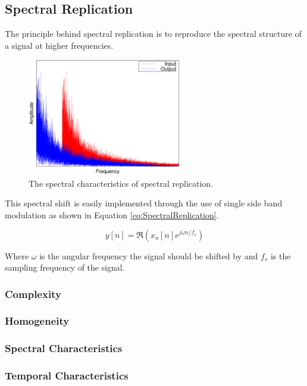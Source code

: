 	\subsection{Spectral Replication}
	\label{sec:Excitation-SpectralReplication}
		The principle behind spectral replication is to reproduce the spectral structure of a signal at higher
		frequencies.

		\begin{figure}[h!]
			\centering
			\includegraphics[width=0.6\textwidth]{chapter3/Images/SpectralReplicationSpectrum.eps}
			\caption{The spectral characteristics of spectral replication.}
			\label{fig:SpectralReplication}
		\end{figure}

		This spectral shift is easily implemented through the use of single side band modulation as shown in
		Equation \ref{eq:SpectralReplication}.

		\begin{equation}
			y[n] = \Re \left( x_{a}[n] e^{j\omega  n/ f_{s}} \right)
			\label{eq:SpectralReplication}
		\end{equation}

		Where $\omega$ is the angular frequency the signal should be shifted by and $f_{s}$ is the sampling
		frequency of the signal.

		\subsubsection*{Complexity}
		\subsubsection*{Homogeneity}
		\subsubsection*{Spectral Characteristics}
		\subsubsection*{Temporal Characteristics}

